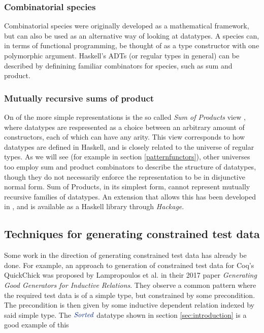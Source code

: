 \documentclass[a4paper,msc,twosized=semi]{uustthesis}
\newcommand*{\mathcolor}{}
\def\mathcolor#1#{\mathcoloraux{#1}}
\newcommand*{\mathcoloraux}[3]{%
  \protect\leavevmode
  \begingroup
    \color#1{#2}#3%
  \endgroup
}
\newcommand{\HSCon}[1]{\mathcolor{hsblue3}{\mathit{#1}}}
\begin{document}
\subsubsection{Combinatorial species}

  Combinatorial species \cite{yorgey2010species} were 
  originally developed as a mathematical framework, but can also be used as an 
  alternative way of looking at datatypes. A species can, in terms of functional 
  programming, be thought of as a type constructor with one polymorphic argument. 
  Haskell’s ADTs (or regular types in general) can be described by definining familiar 
  combinators for species, such as sum and product.

\subsubsection{Mutually recursive sums of product}

  On of the more simple representations is the so called \textit{Sum of Products} view 
  \cite{de2014true}, where datatypes are respresented as a choice between an arbitrary 
  amount of constructors, each of which can have any arity. This view corresponds to 
  how datatypes are defined in Haskell, and is closely related to the universe of 
  regular types. As we will see (for example in section \ref{patternfunctors}), other 
  universes too employ sum and product combinators to describe the structure of 
  datatypes, though they do not necessarily enforce the representation to be in 
  disjunctive normal form. Sum of Products, in its simplest form, cannot represent 
  mutually recursive families of datatypes. An extension that allows this has been 
  developed in \cite{miraldo2018sums}, and is available as a Haskell library through 
  \emph{Hackage}.  

\subsection{Techniques for generating constrained test data}

  Some work in the direction of generating constrained test data has already be done. For example, an approach to generation of constrained test data for Coq's QuickChick was proposed by Lampropoulos et al. \cite{lampropoulos2017generating} in their 2017 paper \textit{Generating Good Generators for Inductive Relations}. They observe a common pattern where the required test data is of a simple type, but constrained by some precondition. The precondition is then given by some inductive dependent relation indexed by said simple type. The \ensuremath{\HSCon{Sorted}} datatype shown in section \ref{sec:introduction} is a good example of this
\end{document}
